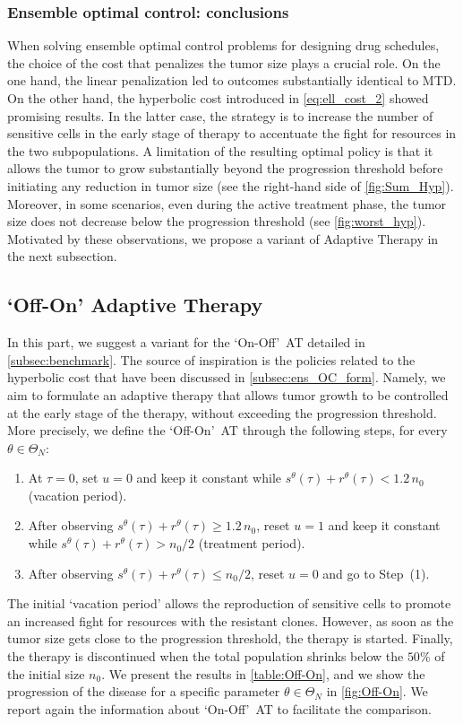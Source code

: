 \documentclass[a4paper,12pt, reqno]{amsart}
\theoremstyle{plain}
\theoremstyle{definition}
\theoremstyle{remark}
\numberwithin{equation}{section}
\begin{document}
\subsubsection*{Ensemble optimal control: conclusions} 
When solving ensemble optimal control problems for designing drug schedules, the choice of the cost that penalizes the tumor size plays a crucial role.
On the one hand, the linear penalization led to outcomes substantially identical to MTD. On the other hand, the hyperbolic cost introduced in \cref{eq:ell_cost_2} showed promising results. 
In the latter case, the strategy is to increase the number of sensitive cells in the early stage of therapy to accentuate the fight for resources in the two sub\-populations.
{A limitation of the resulting optimal policy is that it allows the tumor to grow substantially beyond the progression threshold before initiating any reduction in tumor size (see the right-hand side of \cref{fig:Sum_Hyp}). Moreover, in some scenarios, even during the active treatment phase, the tumor size does not decrease below the progression threshold (see \cref{fig:worst_hyp}).}
{Motivated by} these observations, we propose a variant of Adaptive Therapy in the next subsection.


\subsection{`Off-On' Adaptive Therapy} \label{subsec:Off-On}
In this part, we suggest a variant for the `On-Off'~AT detailed in \cref{subsec:benchmark}.
The source of inspiration is the policies related to the hyperbolic cost that have been discussed in \cref{subsec:ens_OC_form}. 
Namely, we aim to formulate an adaptive therapy that allows tumor growth to be controlled at the early stage of the therapy, without exceeding the progression threshold.
More precisely, we define the `Off-On'~AT through the following steps, for every $\theta\in\Theta_N$:
\begin{enumerate}
\item At $\tau =0$, set {$u=0$} and keep it constant while $s^\theta(\tau) + r^\theta(\tau)<  1.2\, n_0$ (vacation period).
\item After observing $s^\theta(\tau)+r^\theta(\tau)\geq 1.2\, n_0$, reset {$u=1$} and keep it constant while  $s^\theta(\tau) + r^\theta(\tau)> n_0/2$ (treatment period).
\item After observing $s^\theta(\tau) + r^\theta(\tau) \leq n_0/2$, reset {$u=0$} and go to Step~(1).
\end{enumerate}
The initial `vacation period' allows the reproduction of sensitive cells to promote an increased fight for resources with the resistant clones. However, as soon as the tumor size gets close to the progression threshold, the therapy is started. Finally, the therapy is discontinued when the total population shrinks below the $50\%$ of the initial size $n_0$.
We present the results in \cref{table:Off-On}, and we show the {progression} of the disease for a specific parameter $\theta\in \Theta_N$ in \cref{fig:Off-On}. We report again the information about `On-Off'~AT to facilitate the comparison.
\end{document}
